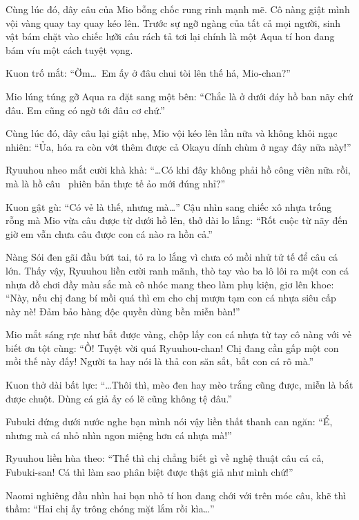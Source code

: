 \documentclass[../main.tex]{subfiles}
\begin{document}
Cùng lúc đó, dây câu của Mio bỗng chốc rung rinh mạnh mẽ. Cô nàng giật mình vội vàng quay tay quay kéo lên. Trước sự ngỡ ngàng của tất cả mọi người, sinh vật bám chặt vào chiếc lưỡi câu rách tả tơi lại chính là một Aqua tí hon đang bám víu một cách tuyệt vọng.

Kuon trố mắt: ``Ờm\dots\ Em ấy ở đâu chui tòi lên thế hả, Mio-chan?''

Mio lúng túng gỡ Aqua ra đặt sang một bên: ``Chắc là ở dưới đáy hồ ban nãy chứ đâu. Em cũng có ngờ tới đâu cơ chứ.''

Cùng lúc đó, dây câu lại giật nhẹ, Mio vội kéo lên lần nữa và không khỏi ngạc nhiên: ``Ủa, hóa ra còn vớt thêm được cả Okayu dính chùm ở ngay đây nữa này!''


Ryuuhou nheo mắt cười khà khà: ``\dots Có khi đây không phải hồ công viên nữa rồi, mà là hồ câu \hll\ phiên bản thực tế ảo mới đúng nhỉ?''

Kuon gật gù: ``Có vẻ là thế, nhưng mà\dots'' Cậu nhìn sang chiếc xô nhựa trống rỗng mà Mio vừa câu được từ dưới hồ lên, thở dài lo lắng: ``Rốt cuộc từ nãy đến giờ em vẫn chưa câu được con cá nào ra hồn cả.''

Nàng Sói đen gãi đầu bứt tai, tỏ ra lo lắng vì chưa có mồi nhử tử tế để câu cá lớn. Thấy vậy, Ryuuhou liền cười ranh mãnh, thò tay vào ba lô lôi ra một con cá nhựa đồ chơi đầy màu sắc mà cô nhóc mang theo làm phụ kiện, giơ lên khoe: ``Này, nếu chị đang bí mồi quá thì em cho chị mượn tạm con cá nhựa siêu cấp này nè! Đảm bảo hàng độc quyền dùng bền miễn bàn!''

Mio mắt sáng rực như bắt được vàng, chộp lấy con cá nhựa từ tay cô nàng với vẻ biết ơn tột cùng: ``Ồ! Tuyệt vời quá Ryuuhou-chan! Chị đang cần gấp một con mồi thế này đấy! Người ta hay nói là thả con săn sắt, bắt con cá rô mà.''

Kuon thở dài bất lực: ``\dots Thôi thì, mèo đen hay mèo trắng cũng được, miễn là bắt được chuột. Dùng cá giả ấy có lẽ cũng không tệ đâu.''

Fubuki đứng dưới nước nghe bạn mình nói vậy liền thất thanh can ngăn: ``Ể, nhưng mà cá nhỏ nhìn ngon miệng hơn cá nhựa mà!''

Ryuuhou liền hùa theo: ``Thế thì chị chẳng biết gì về nghệ thuật câu cá cả, Fubuki-san! Cá thì làm sao phân biệt được thật giả như mình chứ!''

Naomi nghiêng đầu nhìn hai bạn nhỏ tí hon đang chới với trên móc câu, khẽ thì thầm: ``Hai chị ấy trông chóng mặt lắm rồi kìa\dots''
\end{document}
